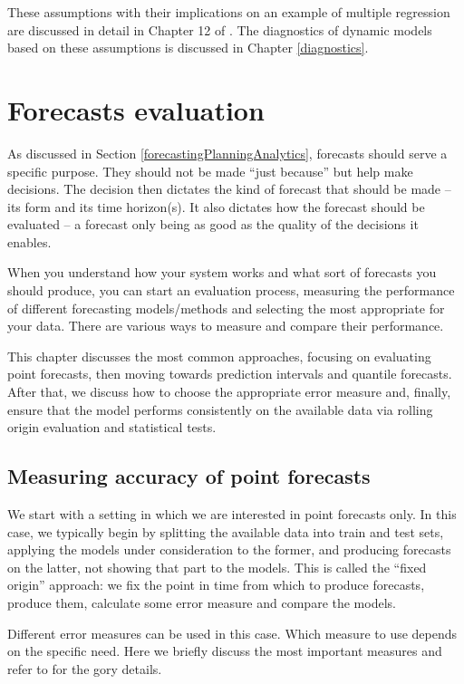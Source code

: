 \documentclass[
]{book}
\theoremstyle{definition}
\theoremstyle{definition}
\theoremstyle{definition}
\theoremstyle{definition}
\theoremstyle{remark}
\begin{document}
These assumptions with their implications on an example of multiple regression are discussed in detail in Chapter 12 of \citet{SvetunkovSBA}. The diagnostics of dynamic models based on these assumptions is discussed in Chapter \ref{diagnostics}.

\hypertarget{forecastsEvaluation}{%
\chapter{Forecasts evaluation}\label{forecastsEvaluation}}

As discussed in Section \ref{forecastingPlanningAnalytics}, forecasts should serve a specific purpose. They should not be made ``just because'' but help make decisions. The decision then dictates the kind of forecast that should be made -- its form and its time horizon(s). It also dictates how the forecast should be evaluated -- a forecast only being as good as the quality of the decisions it enables.

When you understand how your system works and what sort of forecasts you should produce, you can start an evaluation process, measuring the performance of different forecasting models/methods and selecting the most appropriate for your data. There are various ways to measure and compare their performance.

This chapter discusses the most common approaches, focusing on evaluating point forecasts, then moving towards prediction intervals and quantile forecasts. After that, we discuss how to choose the appropriate error measure and, finally, ensure that the model performs consistently on the available data via rolling origin evaluation and statistical tests.

\hypertarget{errorMeasures}{%
\section{Measuring accuracy of point forecasts}\label{errorMeasures}}

We start with a setting in which we are interested in point forecasts only. In this case, we typically begin by splitting the available data into train and test sets, applying the models under consideration to the former, and producing forecasts on the latter, not showing that part to the models. This is called the ``fixed origin'' approach: we fix the point in time from which to produce forecasts, produce them, calculate some error measure and compare the models.

Different error measures can be used in this case. Which measure to use depends on the specific need. Here we briefly discuss the most important measures and refer to \citep{Davydenko2013, SvetunkovAccuracy2019, SvetunkovAPEs2017} for the gory details.
\end{document}
